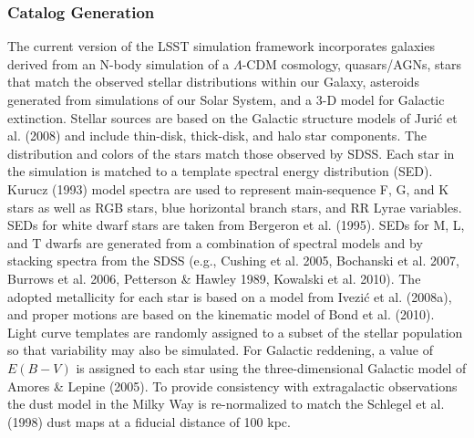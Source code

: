\documentclass{emulateapj}
\begin{document}
{\subsubsection{Catalog Generation}

The current version of the LSST simulation framework incorporates galaxies derived from 
an N-body simulation of a $\Lambda$-CDM cosmology, quasars/AGNs, stars that match the observed 
stellar distributions within our Galaxy, 
asteroids generated from simulations of our Solar System, and a 3-D model for Galactic extinction.  Stellar sources are based 
on the Galactic structure models of Juri\'{c} et al. (2008) and include thin-disk, thick-disk, and halo star components. The 
distribution and colors of the stars match those observed by SDSS. Each star 
in the simulation is matched to a template spectral energy distribution (SED). Kurucz (1993) model spectra are used to represent main-sequence F, G, and K stars as well as RGB stars, blue horizontal branch stars, and RR Lyrae variables.  
SEDs for white dwarf stars 
are taken from Bergeron et al. (1995).  SEDs for M, L, and T dwarfs are generated from a combination of spectral models and 
by stacking spectra from the SDSS (e.g., Cushing et al. 2005, Bochanski et al. 2007, Burrows et al. 2006, Petterson \& Hawley 
1989, Kowalski et al. 2010). The adopted metallicity for each star is based on a model from Ivezi\'{c} et al. (2008a), and 
proper motions are based on the kinematic model of Bond et al. (2010).  Light curve templates 
are randomly assigned to a subset of the stellar population so that variability may also be simulated. For Galactic reddening, 
a value of $E(B-V)$ is assigned to each star using the three-dimensional Galactic model of Amores \& Lepine (2005). To provide consistency with extragalactic observations the dust model in the Milky Way is re-normalized to match the Schlegel et al. (1998) 
dust maps at a fiducial distance of 100 kpc.

}
\end{document}
